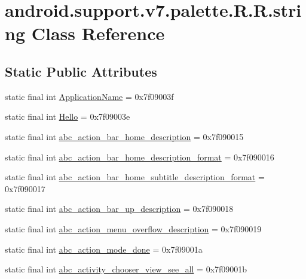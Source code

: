 \hypertarget{classandroid_1_1support_1_1v7_1_1palette_1_1_r_1_1string}{
\section{android.support.v7.palette.R.R.string Class Reference}
\label{classandroid_1_1support_1_1v7_1_1palette_1_1_r_1_1string}
}
\subsection*{Static Public Attributes}
\begin{CompactItemize}
\item 
static final int \hyperlink{classandroid_1_1support_1_1v7_1_1palette_1_1_r_1_1string_6e7c8c67c64f439c12e5c0747a597746}{ApplicationName} = 0x7f09003f
\item 
static final int \hyperlink{classandroid_1_1support_1_1v7_1_1palette_1_1_r_1_1string_89e6d5f385241204bbfbf306a1fe2333}{Hello} = 0x7f09003e
\item 
static final int \hyperlink{classandroid_1_1support_1_1v7_1_1palette_1_1_r_1_1string_3ee4fa07a034eab0db74715838a423db}{abc\_\-action\_\-bar\_\-home\_\-description} = 0x7f090015
\item 
static final int \hyperlink{classandroid_1_1support_1_1v7_1_1palette_1_1_r_1_1string_8fcaad96c5a6c6439ade8e029479e447}{abc\_\-action\_\-bar\_\-home\_\-description\_\-format} = 0x7f090016
\item 
static final int \hyperlink{classandroid_1_1support_1_1v7_1_1palette_1_1_r_1_1string_9f1dd0e2ed968ab2fe7d98d05f0ccbf5}{abc\_\-action\_\-bar\_\-home\_\-subtitle\_\-description\_\-format} = 0x7f090017
\item 
static final int \hyperlink{classandroid_1_1support_1_1v7_1_1palette_1_1_r_1_1string_e843572f0e5335e49f4827005a47619e}{abc\_\-action\_\-bar\_\-up\_\-description} = 0x7f090018
\item 
static final int \hyperlink{classandroid_1_1support_1_1v7_1_1palette_1_1_r_1_1string_c2957a82edeef8eaba53e7748b41c6ef}{abc\_\-action\_\-menu\_\-overflow\_\-description} = 0x7f090019
\item 
static final int \hyperlink{classandroid_1_1support_1_1v7_1_1palette_1_1_r_1_1string_1571bdb0bd388c91a5ef5bc07560dc50}{abc\_\-action\_\-mode\_\-done} = 0x7f09001a
\item 
static final int \hyperlink{classandroid_1_1support_1_1v7_1_1palette_1_1_r_1_1string_edd0562985f7cd59514274701618b846}{abc\_\-activity\_\-chooser\_\-view\_\-see\_\-all} = 0x7f09001b

\end{CompactItemize}
